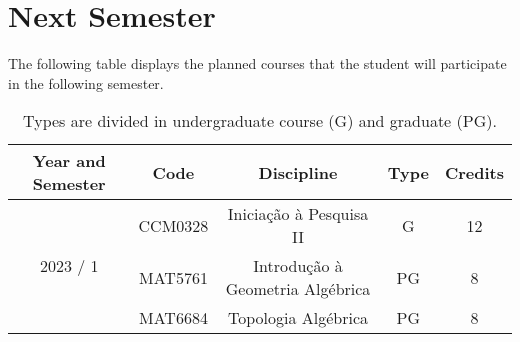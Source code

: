 \documentclass[11pt, reqno]{amsart}
\theoremstyle{definition}
\begin{document}
\section{Next Semester}

The following table displays the planned courses that the student will
participate in the following semester.

\begin{table}[h!]\label{tab:disc}
  \centering
  \caption{Types are divided in undergraduate course (G) and graduate (PG).}
  \begin{tabular}{ |c|c|c|c|c| }
    \hline
    Year and Semester & Code & Discipline & Type & Credits \\
    \hline
    \multirow{3}{*}{2023 / 1}
                   & CCM0328 & Iniciação à Pesquisa II            & G  & 12 \\
                   & MAT5761 & Introdução à Geometria Algébrica   & PG & 8 \\
                   & MAT6684 & Topologia Algébrica                & PG & 8 \\
    \hline
\end{tabular}
\end{table}
\end{document}
